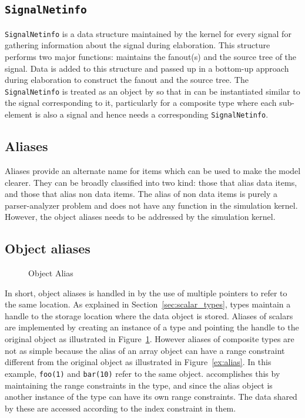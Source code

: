 \documentclass[11pt]{article}
\begin{document}
\subsection{\texttt{SignalNetinfo}}

\texttt{SignalNetinfo} is a data structure maintained by the \tyvis\/
kernel for every signal for gathering information about the signal during
elaboration.  This structure performs two major functions: maintains the
fanout(s) and the source tree of the signal.  Data is added to this
structure and passed up in a bottom-up approach during elaboration to
construct the fanout and the source tree.  The
\texttt{SignalNetinfo} is treated as an object by \tyvis\/ so that in
can be instantiated similar to the signal corresponding to it,
particularly for a composite type where each sub-element is also a
signal and hence needs a corresponding \texttt{SignalNetinfo}.

\subsection{Aliases}

Aliases provide an alternate name for items which can be used to make
the model clearer.  They can be broadly classified into two kind:
those that alias data items, and those that alias non data items.  The
alias of non data items is purely a parser-analyzer problem and does
not have any function in the simulation kernel.  However, the object
aliases needs to be addressed by the simulation kernel.

\subsection{Object aliases}

\begin{figure}[htbp]
  \centerline{}
  \caption{Object Alias}
  \label{fig:alias}
\end{figure}

In short, object aliases is handled in \tyvis\/ by the use of multiple
pointers to refer to the same location.  As explained in
Section~\ref{sec:scalar_types}, types maintain a handle to the storage
location where the data object is stored.  Aliases of scalars are
implemented by creating an instance of a type and pointing the handle
to the original object as illustrated in Figure~\ref{fig:alias}.
However aliases of composite types are not as simple because the alias
of an array object can have a range constraint different from the
original object as illustrated in Figure~\ref{ex:alias}.  In this
example, \texttt{foo(1)} and \texttt{bar(10)} refer to the same
object.  \tyvis\/ accomplishes this by maintaining the range
constraints in the type, and since the alias object is another
instance of the type can have its own range constraints.  The data
shared by these are accessed according to the index constraint in
them.
\end{document}
